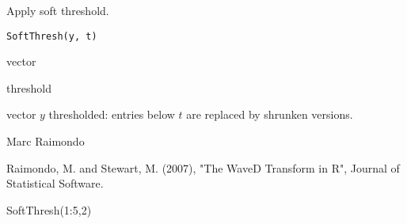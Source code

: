 \documentclass{article}
\begin{document}
\begin{Description}\relax
Apply soft threshold.
\end{Description}
\begin{Usage}
\begin{verbatim}
SoftThresh(y, t)
\end{verbatim}
\end{Usage}
\begin{Arguments}
\begin{ldescription}
\item[\code{y}] vector
\item[\code{t}] threshold 
\end{ldescription}
\end{Arguments}
\begin{Value}
vector $y$ thresholded:  entries below $t$ are replaced by shrunken versions.
\end{Value}
\begin{Author}\relax
Marc Raimondo
\end{Author}
\begin{References}\relax
Raimondo, M. and Stewart, M. (2007),
"The WaveD Transform in R", Journal of Statistical Software.
\end{References}
\begin{SeeAlso}\relax
{}
\end{SeeAlso}
\begin{Examples}
\begin{ExampleCode}
SoftThresh(1:5,2)
  \end{ExampleCode}
\end{Examples}
\end{document}
